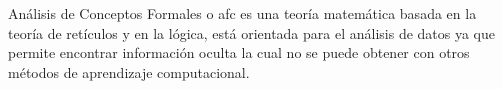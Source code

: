\documentclass[../../main.tex]{subfiles}
\begin{document}
Análisis de Conceptos Formales o \gls{afc}\cite{fca} es una teoría matemática basada en la teoría de retículos y en la lógica, está orientada para el análisis de datos ya que permite encontrar información oculta la cual no se puede obtener con otros métodos de aprendizaje computacional.  \\
\end{document}
